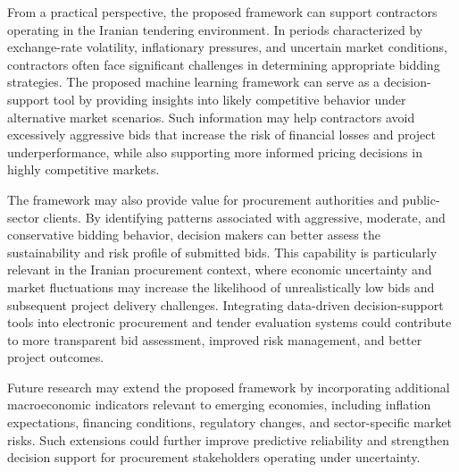 \documentclass[twoside]{article}
\begin{document}
From a practical perspective, the proposed framework can support contractors operating in the Iranian tendering environment. In periods characterized by exchange-rate volatility, inflationary pressures, and uncertain market conditions, contractors often face significant challenges in determining appropriate bidding strategies. The proposed machine learning framework can serve as a decision-support tool by providing insights into likely competitive behavior under alternative market scenarios. Such information may help contractors avoid excessively aggressive bids that increase the risk of financial losses and project underperformance, while also supporting more informed pricing decisions in highly competitive markets.

The framework may also provide value for procurement authorities and public-sector clients. By identifying patterns associated with aggressive, moderate, and conservative bidding behavior, decision makers can better assess the sustainability and risk profile of submitted bids. This capability is particularly relevant in the Iranian procurement context, where economic uncertainty and market fluctuations may increase the likelihood of unrealistically low bids and subsequent project delivery challenges. Integrating data-driven decision-support tools into electronic procurement and tender evaluation systems could contribute to more transparent bid assessment, improved risk management, and better project outcomes.

Future research may extend the proposed framework by incorporating additional macroeconomic indicators relevant to emerging economies, including inflation expectations, financing conditions, regulatory changes, and sector-specific market risks. Such extensions could further improve predictive reliability and strengthen decision support for procurement stakeholders operating under uncertainty.
\end{document}

